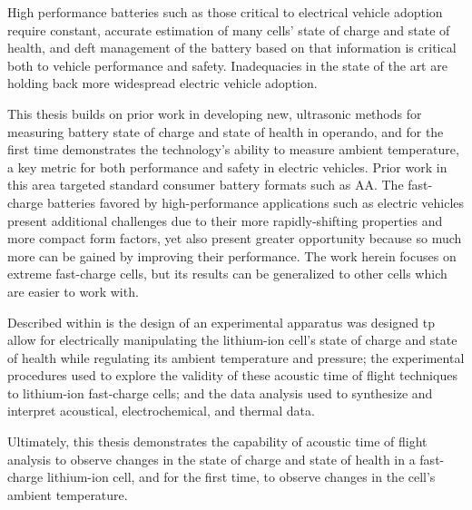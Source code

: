 High performance batteries such as those critical to electrical vehicle adoption require constant, accurate estimation of many cells' state of charge and state of health, and deft management of the battery based on that information is critical both to vehicle performance and safety. 
Inadequacies in the state of the art are holding back more widespread electric vehicle adoption. 

This thesis builds on prior work in developing new, ultrasonic methods for measuring battery state of charge and state of health in operando, and for the first time demonstrates the technology's ability to measure ambient temperature, a key metric for both performance and safety in electric vehicles.
Prior work in this area targeted standard consumer battery formats such as AA. 
The fast-charge batteries favored by high-performance applications such as electric vehicles present additional challenges due to their more rapidly-shifting properties and more compact form factors, yet also present greater opportunity because so much more can be gained by improving their performance. 
The work herein focuses on extreme fast-charge cells, but its results can be generalized to other cells which are easier to work with.

Described within is the design of an experimental apparatus was designed tp allow for electrically manipulating the lithium-ion cell's state of charge and state of health while regulating its ambient temperature and pressure; the experimental procedures used to explore the validity of these acoustic time of flight techniques to lithium-ion fast-charge cells; and the data analysis used to synthesize and interpret acoustical, electrochemical, and thermal data.

Ultimately, this thesis demonstrates the capability of acoustic time of flight analysis to observe changes in the state of charge and state of health in a fast-charge lithium-ion cell, and for the first time, to observe changes in the cell's ambient temperature.